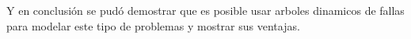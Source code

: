 \documentclass[11pt]{article}
\begin{document}
Y en conclusi\'on se pud\'o demostrar que es posible usar arboles dinamicos de fallas para modelar este tipo de problemas y mostrar sus ventajas.








\end{document}
